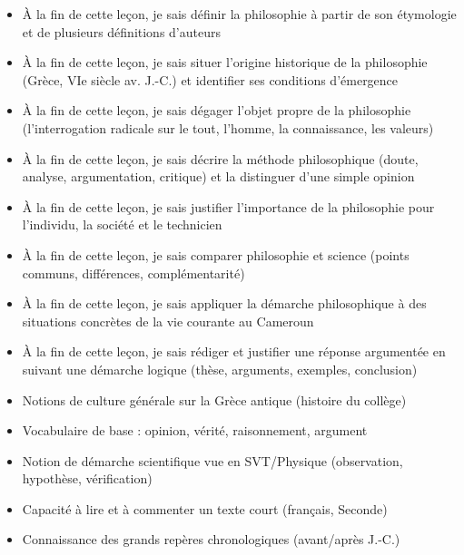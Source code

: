 \documentclass[11pt]{article}
\begin{document}
\begin{objectifs}
\begin{itemize}
\item À la fin de cette leçon, je sais définir la philosophie à partir de son étymologie et de plusieurs définitions d'auteurs
\item À la fin de cette leçon, je sais situer l'origine historique de la philosophie (Grèce, VIe siècle av. J.-C.) et identifier ses conditions d'émergence
\item À la fin de cette leçon, je sais dégager l'objet propre de la philosophie (l'interrogation radicale sur le tout, l'homme, la connaissance, les valeurs)
\item À la fin de cette leçon, je sais décrire la méthode philosophique (doute, analyse, argumentation, critique) et la distinguer d'une simple opinion
\item À la fin de cette leçon, je sais justifier l'importance de la philosophie pour l'individu, la société et le technicien
\item À la fin de cette leçon, je sais comparer philosophie et science (points communs, différences, complémentarité)
\item À la fin de cette leçon, je sais appliquer la démarche philosophique à des situations concrètes de la vie courante au Cameroun
\item À la fin de cette leçon, je sais rédiger et justifier une réponse argumentée en suivant une démarche logique (thèse, arguments, exemples, conclusion)
\end{itemize}
\end{objectifs}

\begin{prerequis}
\begin{itemize}
\item Notions de culture générale sur la Grèce antique (histoire du collège)
\item Vocabulaire de base : opinion, vérité, raisonnement, argument
\item Notion de démarche scientifique vue en SVT/Physique (observation, hypothèse, vérification)
\item Capacité à lire et à commenter un texte court (français, Seconde)
\item Connaissance des grands repères chronologiques (avant/après J.-C.)
\end{itemize}
\end{prerequis}

\newpage
\end{document}
